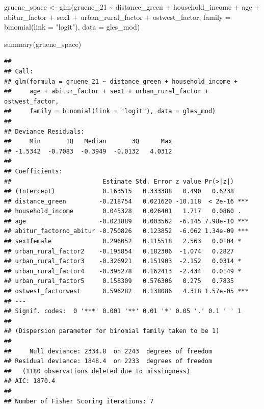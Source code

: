 \documentclass[
]{article}
\newenvironment{Shaded}{\begin{snugshade}}{\end{snugshade}}
\newcommand{\AttributeTok}[1]{\textcolor[rgb]{0.77,0.63,0.00}{#1}}
\newcommand{\FunctionTok}[1]{\textcolor[rgb]{0.00,0.00,0.00}{#1}}
\newcommand{\NormalTok}[1]{#1}
\newcommand{\OtherTok}[1]{\textcolor[rgb]{0.56,0.35,0.01}{#1}}
\newcommand{\SpecialCharTok}[1]{\textcolor[rgb]{0.00,0.00,0.00}{#1}}
\newcommand{\StringTok}[1]{\textcolor[rgb]{0.31,0.60,0.02}{#1}}
\begin{document}
\begin{Shaded}
\begin{Highlighting}[]
\NormalTok{gruene\_space }\OtherTok{\textless{}{-}} \FunctionTok{glm}\NormalTok{(gruene\_21 }\SpecialCharTok{\textasciitilde{}}\NormalTok{ distance\_green }\SpecialCharTok{+}\NormalTok{ household\_income }\SpecialCharTok{+}\NormalTok{ age }\SpecialCharTok{+}\NormalTok{ abitur\_factor }\SpecialCharTok{+}\NormalTok{ sex1 }\SpecialCharTok{+}\NormalTok{ urban\_rural\_factor }\SpecialCharTok{+}\NormalTok{ ostwest\_factor, }\AttributeTok{family =} \FunctionTok{binomial}\NormalTok{(}\AttributeTok{link =} \StringTok{"logit"}\NormalTok{), }\AttributeTok{data =}\NormalTok{ gles\_mod)}


\FunctionTok{summary}\NormalTok{(gruene\_space)}
\end{Highlighting}
\end{Shaded}

\begin{verbatim}
## 
## Call:
## glm(formula = gruene_21 ~ distance_green + household_income + 
##     age + abitur_factor + sex1 + urban_rural_factor + ostwest_factor, 
##     family = binomial(link = "logit"), data = gles_mod)
## 
## Deviance Residuals: 
##     Min       1Q   Median       3Q      Max  
## -1.5342  -0.7083  -0.3949  -0.0132   4.0312  
## 
## Coefficients:
##                         Estimate Std. Error z value Pr(>|z|)    
## (Intercept)             0.163515   0.333388   0.490   0.6238    
## distance_green         -0.218754   0.021620 -10.118  < 2e-16 ***
## household_income        0.045328   0.026401   1.717   0.0860 .  
## age                    -0.021889   0.003562  -6.145 7.98e-10 ***
## abitur_factorno_abitur -0.750826   0.123852  -6.062 1.34e-09 ***
## sex1female              0.296052   0.115518   2.563   0.0104 *  
## urban_rural_factor2    -0.195854   0.182306  -1.074   0.2827    
## urban_rural_factor3    -0.326921   0.151903  -2.152   0.0314 *  
## urban_rural_factor4    -0.395278   0.162413  -2.434   0.0149 *  
## urban_rural_factor5     0.158309   0.576306   0.275   0.7835    
## ostwest_factorwest      0.596282   0.138086   4.318 1.57e-05 ***
## ---
## Signif. codes:  0 '***' 0.001 '**' 0.01 '*' 0.05 '.' 0.1 ' ' 1
## 
## (Dispersion parameter for binomial family taken to be 1)
## 
##     Null deviance: 2334.8  on 2243  degrees of freedom
## Residual deviance: 1848.4  on 2233  degrees of freedom
##   (1180 observations deleted due to missingness)
## AIC: 1870.4
## 
## Number of Fisher Scoring iterations: 7
\end{verbatim}
\end{document}
